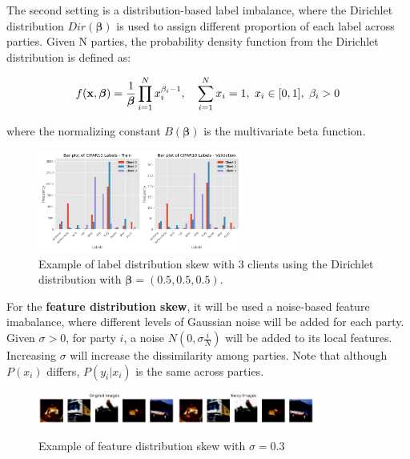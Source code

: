 The second setting is a distribution-based label imbalance, where the Dirichlet distribution $Dir(\boldsymbol{\beta})$  is used to assign different proportion of each label across parties. Given N parties, the probability density function from the Dirichlet distribution is defined as:

\begin{equation*}
  f(\mathbf{x}, \boldsymbol{\beta}) = \frac{1}{\boldsymbol{\beta}} \prod_{i=1}^N x_i^{\beta_i - 1}, \quad \sum_{i=1}^N x_i = 1, \hspace*{.3 em} x_i \in [0,1], \hspace*{.3 em} \beta_i > 0
\end{equation*}

where the normalizing constant $B(\boldsymbol{\beta})$ is the multivariate beta function.

\begin{figure}[H]
  \centering
  \includegraphics[width=0.6\textwidth]{figures/2-Federated_Learning/Example_Dirichlet_beta_0_5_3_clients.png}
  \caption{Example of label distribution skew with 3 clients using the Dirichlet distribution with $\boldsymbol{\beta}=(0.5, 0.5, 0.5)$.}
  \label{fig:label_distribution_skew_Dirichlet}
\end{figure}

For the \textbf{feature distribution skew}, it will be used a noise-based feature imabalance, where different levels of Gaussian noise will be added for each party. Given $\sigma > 0$, for party $i$, a noise $N(0, \sigma \frac{i}{N})$ will be added to its local features. Increasing $\sigma$ will increase the dissimilarity among parties. Note that although $P(x_i)$ differs, $P(y_i | x_i)$ is the same across parties.

\begin{figure}[!ht]
\centering
\includegraphics[width=0.4\textwidth]{figures/2-Federated_Learning/Example_noise_based_feature_imabalance_original.png}
\includegraphics[width=0.4\textwidth]{figures/2-Federated_Learning/Example_noise_based_feature_imabalance_Gaussian_0.3.png}
\caption{Example of feature distribution skew with $\sigma=0.3$}
\label{fig:feature_distribution_skew_sigma_03}
\end{figure}

